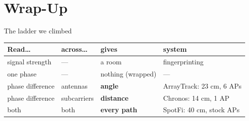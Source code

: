 
\section[Wrap-up]{Wrap-Up}


\begin{frame}{The ladder we climbed}
  \vspace{0.4em}
  \centering
  {\footnotesize\setlength{\tabcolsep}{5pt}
  \begin{tabular}{llll}
    \toprule
    Read\ldots & across\ldots & gives & system \\
    \midrule
    \textcolor{softgray}{signal strength} & --- & a room &
      fingerprinting \\[3pt]
    \textcolor{ranblue}{one phase} & --- & nothing (wrapped) & --- \\[3pt]
    \textcolor{ranblue}{phase difference} & \textcolor{ranblue}{antennas} &
      \textbf{angle} & ArrayTrack: 23 cm, 6 APs \\[3pt]
    \textcolor{coreorange}{phase difference} & \textcolor{coreorange}{subcarriers} &
      \textbf{distance} & Chronos: 14 cm, 1 AP \\[3pt]
    \textcolor{softgreen}{both} & both & \textbf{every path} &
      SpotFi: 40 cm, stock APs \\
    \bottomrule
  \end{tabular}\par}

  \vspace{0.8em}
\end{frame}

